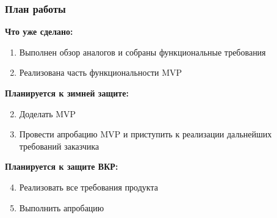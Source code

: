 \documentclass{vkr-slides-style}
\begin{document}
\begin{frame}  
    \frametitle{План работы}
    \textbf{Что уже сделано:}
    \begin{enumerate}
        \item Выполнен обзор аналогов и собраны функциональные требования
        \item Реализована часть функциональности MVP
    \end{enumerate}

    \textbf{Планируется к зимней защите:}
    \begin{enumerate}
        \setcounter{enumi}{1}
        \item Доделать MVP
        \item Провести апробацию MVP и приступить к реализации дальнейших требований заказчика
    \end{enumerate}

    \textbf{Планируется к защите ВКР:}
    \begin{enumerate}
        \setcounter{enumi}{3}
        \item Реализовать все требования продукта
        \item Выполнить апробацию
    \end{enumerate}
\end{frame}
\end{document}
